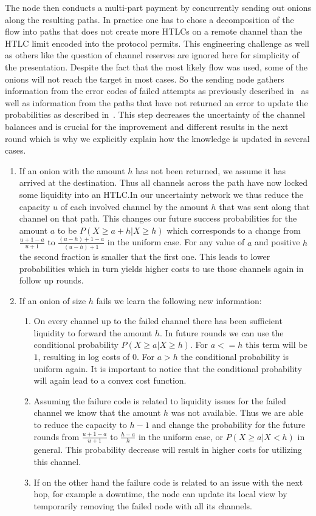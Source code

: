 \documentclass[10pt,twocolumn]{article}
\begin{document}
The node then conducts a multi-part payment by concurrently sending out onions along the resulting paths.
In practice one has to chose a decomposition of the flow into paths that does not create more HTLCs on a remote channel than the HTLC limit encoded into the protocol permits.
This engineering challenge as well as others like the question of channel reserves are ignored here for simplicity of the presentation.
Despite the fact that the most likely flow was used, some of the onions will not reach the target in most cases. So the sending node gathers information from the error codes of failed attempts as previously described in~\cite{tikhomirov2020probing} as well as information from the paths that have not returned an error to update the probabilities as described in~\cite{pickhardt2021security}.
This step decreases the uncertainty of the channel balances and is crucial for the improvement and different results in the next round which is why we explicitly explain how the knowledge is updated in several cases.
\begin{enumerate}
\item If an onion with the amount $h$ has not been returned, we assume it has arrived at the destination. Thus all channels across the path have now locked some liquidity into an HTLC.\@ In our uncertainty network we thus reduce the capacity $u$ of each involved channel by the amount $h$ that was sent along that channel on that path. This changes our future success probabilities for the amount $a$ to be $P(X\geq a+h|X\geq h)$ which corresponds to a change from $\frac{u+1-a}{u+1}$ to $\frac{(u-h)+1-a}{(u-h)+1}$ in the uniform case. For any value of $a$ and positive $h$ the second fraction is smaller that the first one. This leads to lower probabilities which in turn yields higher costs to use those channels again in follow up rounds.
\item If an onion of size $h$ fails we learn the following new information:
  \begin{enumerate}
  \item On every channel up to the failed channel there has been sufficient liquidity to forward the amount $h$. In future rounds we can use the conditional probability $P(X\geq a|X\geq h)$. For $a<=h$ this term will be $1$, resulting in log costs of $0$. For $a>h$ the conditional probability is uniform again. It is important to notice that the conditional probability will again lead to a convex cost function.
  \item Assuming the failure code is related to liquidity issues for the failed channel we know that the amount $h$ was not available. Thus we are able to reduce the capacity to $h-1$ and change the probability for the future rounds from $\frac{u+1-a}{u+1}$ to $\frac{h-a}{h}$ in the uniform case, or $P(X\geq a|X < h)$ in general. This probability decrease will result in higher costs for utilizing this channel.
  \item If on the other hand the failure code is related to an issue with the next hop, for example a downtime, the node can update its local view by temporarily removing the failed node with all its channels.
  \end{enumerate}
\end{enumerate}
\end{document}
